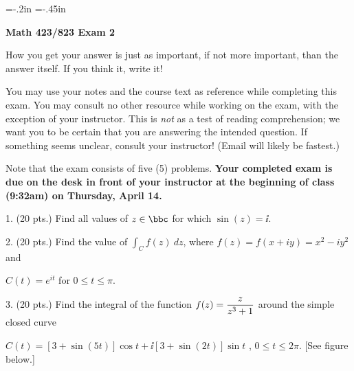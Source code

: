     

\voffset=-.2in
\vsize=11in
\hoffset=-.45in
\hsize=6.2in

\loadmsbm

\def\ssk{\smallskip}
\def\ctln{\centerline}
\def\msk{\medskip}
\def\bsk{\bigskip}
\def\dl{\displaystyle}
\def\vdd{\bigskip}
\def\vfe{\vfill\eject}
\def\vdr{\bigskip}
\ra{\rightarrow}




\overfullrule=0pt
\nopagenumbers

\centerline{\bf Math 423/823 Exam 2}

\smallskip

 How you get your answer is just 
as important, if not more important, than the 
answer itself. If you think it, write it!

\msk

\noindent You may use your notes and the course text as reference while 
completing this exam. You may consult no other resource while working
on the exam, with the exception of your instructor. This is {\it not}
as a test of reading comprehension; we want you to be certain that you
are answering the intended question. If something seems unclear, consult
your instructor! (Email will likely be fastest.) 

\msk

\noindent Note that the exam consists of five (5) problems.
{\bf Your completed exam is due on the desk in front of your instructor at the 
beginning of class (9:32am) on Thursday, April 14.}

\bigskip

\item{1.} (20 pts.) Find all values of $z\in \bbc$ for which $\sin(z)=\ii$.

\vdd

\item{2.} (20 pts.) Find the value of $\dl\int_C f(z)\ dz$, where 
$f(z)=f(x+iy)=x^2-iy^2$ and 

\item{} $C(t)=e^{it}$ for $0\leq t\leq \pi$.

\vdd

\item{3.} (20 pts.) Find the integral of the function $\dl f(z)={{z}\over{z^3+1}}$ around the 
simple closed curve 

\ssk

\item{} $C(t)=[3+\sin(5t)]\cos t + \ii[3+\sin(2t)]\sin t$ , $0\leq t\leq 2\pi$.
[See figure below.]


